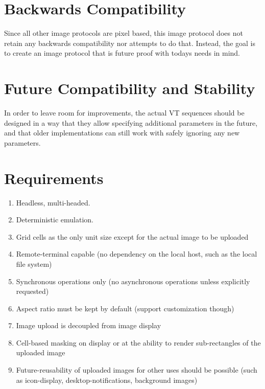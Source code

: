 \documentclass{article}
\begin{document}

\section{Backwards Compatibility} %

Since all other image protocols are pixel based, this image protocol does not retain any
backwards compatibility nor attempts to do that. Instead, the goal is to create
an image protocol that is future proof with todays needs in mind.

\section{Future Compatibility and Stability} %

In order to leave room for improvements, the actual VT sequences should be designed in a way
that they allow specifying additional parameters in the future, and that older implementations
can still work with safely ignoring any new parameters.

\section{Requirements} %

\begin{enumerate}
    \item Headless, multi-headed.
    \item Deterministic emulation.
    \item Grid cells as the only unit size except for the actual image to be uploaded
    \item Remote-terminal capable (no dependency on the local host, such as the local file system)
    \item Synchronous operations only (no asynchronous operations unless explicitly requested)
    \item Aspect ratio must be kept by default (support customization though)
    \item Image upload is decoupled from image display
    \item Cell-based masking on display or at the ability to render sub-rectangles of the uploaded image
    \item Future-reusability of uploaded images for other uses should be possible (such as
        icon-display, desktop-notifications, background images)
\end{enumerate}
\end{document}
